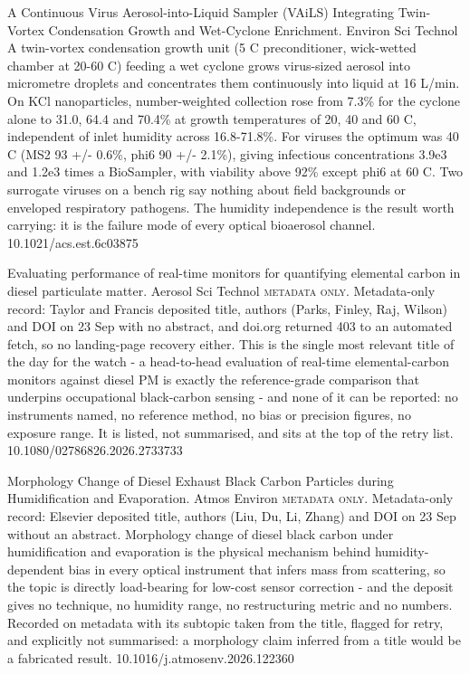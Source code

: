 \documentclass[10pt]{article}
\begin{document}
{A Continuous Virus Aerosol-into-Liquid Sampler (VAiLS) Integrating Twin-Vortex Condensation Growth and Wet-Cyclone Enrichment.}
{Environ Sci Technol}
{A twin-vortex condensation growth unit (5 C preconditioner, wick-wetted chamber at 20-60 C) feeding a wet cyclone grows virus-sized aerosol into micrometre droplets and concentrates them continuously into liquid at 16 L/min. On KCl nanoparticles, number-weighted collection rose from 7.3\% for the cyclone alone to 31.0, 64.4 and 70.4\% at growth temperatures of 20, 40 and 60 C, independent of inlet humidity across 16.8-71.8\%. For viruses the optimum was 40 C (MS2 93 +/- 0.6\%, phi6 90 +/- 2.1\%), giving infectious concentrations 3.9e3 and 1.2e3 times a BioSampler, with viability above 92\% except phi6 at 60 C. Two surrogate viruses on a bench rig say nothing about field backgrounds or enveloped respiratory pathogens. The humidity independence is the result worth carrying: it is the failure mode of every optical bioaerosol channel.}
{10.1021/acs.est.6c03875}

{Evaluating performance of real-time monitors for quantifying elemental carbon in diesel particulate matter.}
{Aerosol Sci Technol}
{\textsc{metadata only.} Metadata-only record: Taylor and Francis deposited title, authors (Parks, Finley, Raj, Wilson) and DOI on 23 Sep with no abstract, and doi.org returned 403 to an automated fetch, so no landing-page recovery either. This is the single most relevant title of the day for the watch - a head-to-head evaluation of real-time elemental-carbon monitors against diesel PM is exactly the reference-grade comparison that underpins occupational black-carbon sensing - and none of it can be reported: no instruments named, no reference method, no bias or precision figures, no exposure range. It is listed, not summarised, and sits at the top of the retry list.}
{10.1080/02786826.2026.2733733}

{Morphology Change of Diesel Exhaust Black Carbon Particles during Humidification and Evaporation.}
{Atmos Environ}
{\textsc{metadata only.} Metadata-only record: Elsevier deposited title, authors (Liu, Du, Li, Zhang) and DOI on 23 Sep without an abstract. Morphology change of diesel black carbon under humidification and evaporation is the physical mechanism behind humidity-dependent bias in every optical instrument that infers mass from scattering, so the topic is directly load-bearing for low-cost sensor correction - and the deposit gives no technique, no humidity range, no restructuring metric and no numbers. Recorded on metadata with its subtopic taken from the title, flagged for retry, and explicitly not summarised: a morphology claim inferred from a title would be a fabricated result.}
{10.1016/j.atmosenv.2026.122360}
\end{document}
